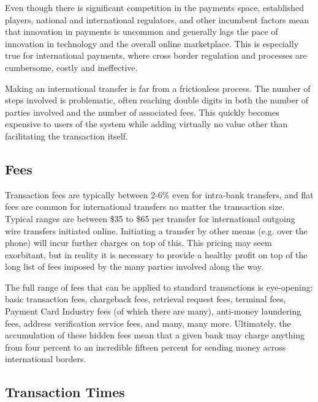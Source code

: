 \documentclass[a4paper]{article}
\begin{document}
Even though there is significant competition in the payments space,
established players, national and international regulators, and other
incumbent factors mean that innovation in payments is uncommon and
generally lags the pace of innovation in technology and the overall
online marketplace. This is especially true for international
payments, where cross border regulation and processes are cumbersome,
costly and ineffective.

Making an international transfer is far from a frictionless
process. The number of steps involved is problematic, often reaching
double digits in both the number of parties involved and the number of
associated fees. This quickly becomes expensive to users of the system
while adding virtually no value other than facilitating the
transaction itself.

\subsection{Fees}


Transaction fees are typically between 2-6\% even for intra-bank
transfers, and flat fees are common for international transfers no
matter the transaction size. Typical ranges are between \$35 to \$65
per transfer for international outgoing wire transfers initiated
online. Initiating a transfer by other means (e.g. over the phone)
will incur further charges on top of this. This pricing may seem
exorbitant, but in reality it is necessary to provide a healthy profit
on top of the long list of fees imposed by the many parties involved
along the way.

The full range of fees that can be applied to standard transactions is
eye-opening: basic transaction fees, chargeback fees, retrieval
request fees, terminal fees, Payment Card Industry fees (of which
there are many), anti-money laundering fees, address verification
service fees, and many, many more. Ultimately, the accumulation of
these hidden fees mean that a given bank may charge anything from four
percent to an incredible fifteen percent for sending money across
international borders.

\subsection{Transaction Times}
\end{document}

